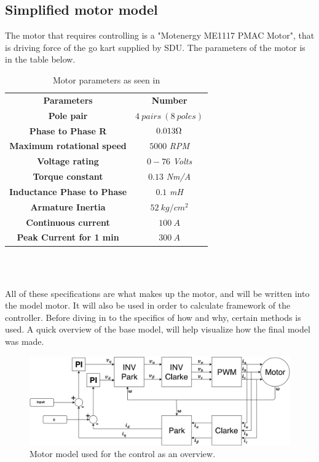 \subsection{Simplified motor model}
The motor that requires controlling is a "Motenergy ME1117 PMAC Motor", that is driving force of the go kart supplied by SDU. The parameters of the motor is in the table below.

\begin{table} [H]
\centering
\begin{tabular}{|c|c|} \cline{1-2}
\textbf{Parameters} & \textbf{Number} \\ \cline{1-2}
\textbf{Pole pair} & $4\ pairs\ (8\ poles)$ \\ \cline{1-2}
\textbf{Phase to Phase R} & $0.013\ohm$ \\ \cline{1-2}
\textbf{Maximum rotational speed} & $5000$ \textit{RPM} \\ \cline{1-2}
\textbf{Voltage rating} & $0-76$ \textit{Volts} \\ \cline{1-2}
\textbf{Torque constant} & $0.13$ \textit{Nm/A} \\ \cline{1-2}
\textbf{Inductance Phase to Phase} & $0.1$ \textit{mH} \\ \cline{1-2}
\textbf{Armature Inertia} & $52\ kg/cm^2$ \\ \cline{1-2}
\textbf{Continuous current} & $100\ A$ \\ \cline{1-2}
\textbf{Peak Current for 1 min} & $300\ A$ \\ \cline{1-2}  
\end{tabular} \\
\caption{Motor parameters as seen in \cite{Motor_Parameters}}
\label{Motor_parameters_list}
\end{table} \\

All of these specifications are what makes up the motor, and will be written into the model motor. It will also be used in order to calculate framework of the controller. Before diving in to the specifics of how and why, certain methods is used. A quick overview of the base model, will help visualize how the final model was made.\\

\begin{figure} [H]
    \centering
    \includegraphics[scale=0.42]{pictures/control/udklip.PNG}
    \caption{Motor model used for the control as an overview.}
    \label{fig:Motor_model}
\end{figure} \\

